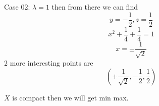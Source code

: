 \documentclass[letter]{article}
\begin{document}
Case 02: $\lambda  = 1$ then from there we can find 
\[
y = - \frac{1}{2}, z = \frac{1}{2}
\] 
\[
x^2 + \frac{1}{4} + \frac{1}{4} = 1
\] 
\[
x = \pm \frac{1}{\sqrt{2} }
\] 
$2$ more interesting points are 
\[
	\left(
\pm \frac{1}{\sqrt{2} }, - \frac{1}{2}, \frac{1}{2}
	\right)
\]

$X$ is compact then we will get min max. 
\end{document}
